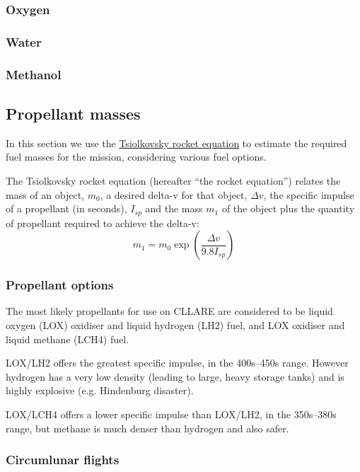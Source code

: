 \documentclass{report}
\begin{document}
\subsubsection{Oxygen}
\subsubsection{Water}
\subsubsection{Methanol}

\subsection{Propellant masses}

In this section we use the \href{http://en.wikipedia.org/wiki/Tsiolkovsky_rocket_equation}{Tsiolkovsky rocket equation} to estimate the required fuel masses for the mission, considering various fuel options.

The Tsiolkovsky rocket equation (hereafter ``the rocket equation'') relates the mass of an object, $m_0$, a desired delta-v for that object, $\Delta v$, the specific impulse of a propellant (in seconds), $I_{sp}$ and the mass $m_1$ of the object plus the quantity of propellant required to achieve the delta-v:
\begin{equation}
m_1 = m_0\exp \left( \frac{\Delta v}{9.8 I_{sp}} \right)
\end{equation}

\subsubsection{Propellant options}

The most likely propellants for use on CLLARE are considered to be liquid oxygen (LOX) oxidiser and liquid hydrogen (LH2) fuel, and LOX oxidiser and liquid methane (LCH4) fuel.

LOX/LH2 offers the greatest specific impulse, in the 400s--450s range.  However hydrogen has a very low density (leading to large, heavy storage tanks) and is highly explosive (e.g. Hindenburg disaster).

LOX/LCH4 offers a lower specific impulse than LOX/LH2, in the 350s--380s range, but methane is much denser than hydrogen and also safer.

\subsubsection{Circumlunar flights}
\end{document}
